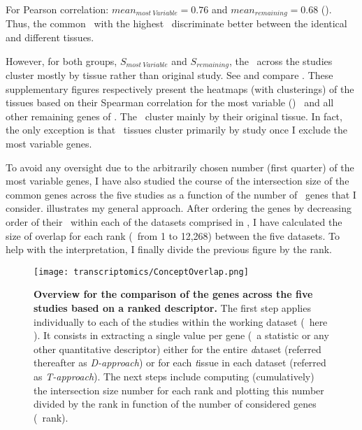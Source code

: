 For Pearson correlation:
$mean_{most~Variable}=0.76$ and $mean_{remaining}=0.68$
().
Thus, the common \pcgs\ with the highest \cv\
discriminate better between the identical and different tissues.

However, for both groups,
$S_{most~Variable}$ and $S_{remaining}$,
the \treps\ across the studies cluster mostly by tissue rather than
original study.
See and compare .
These supplementary figures respectively present
the heatmaps (with clusterings) of the tissues
based on their Spearman correlation for the most variable (\cv) \pcgs\
and all other remaining genes of \setOne.
The \treps\ cluster mainly by their original tissue.
In fact, the only exception is that
\castle\ tissues cluster primarily by study
once I exclude the most variable genes.

To avoid any oversight due to the arbitrarily chosen number (first quarter)
of the most variable genes,
I have also studied the course of the intersection size of the common genes
across the five studies
as a function of the number of \setOne\ genes that I consider.
 illustrates my general approach.
After ordering the genes by decreasing order of their \cv\
within each of the datasets comprised in \setOne,
I have calculated the size of overlap for each rank (\ie\ from 1 to 12,268)
between the five datasets.
To help with the interpretation,
I finally divide the previous figure by the rank.

\begin{figure}[!htpb]
    \texttt{[image: transcriptomics/ConceptOverlap.png]}\centering
    \caption[Overview for the comparison of the genes across the five
    studies based on a ranked descriptor 5 studies]{\label{fig:overlapConcept}%
    \textbf{Overview for the comparison of the genes across the five
    studies based on a ranked descriptor.}
    The first step applies individually to each of the studies
    within the working dataset (\ie\ here \setOne).
    It consists in extracting a single value per gene
    (\eg\ a statistic or any other quantitative descriptor)
    either for the entire \emph{d}ataset (referred thereafter as \emph{D-approach}) or
    for each \emph{t}issue in each dataset (referred as \emph{T-approach}).
    The next steps include
    computing (cumulatively) the intersection size number for each rank
    and plotting this number divided by the rank
    in function of the number of considered genes (\ie\ rank).}
\end{figure}


